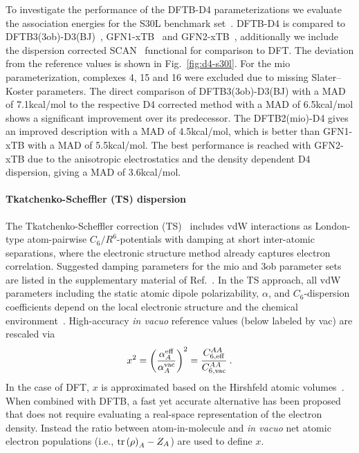 \documentclass[reprint,onecolumn,superscriptaddress]{revtex4-1}
\begin{document}
To investigate the performance of the DFTB-D4 parameterizations we evaluate the
association energies for the S30L benchmark set~\cite{sure2015,brandenburg2018}.
DFTB-D4 is compared to DFTB3(3ob)-D3(BJ)~\cite{brandenburg2014},
GFN1-xTB~\cite{grimme2017} and GFN2-xTB~\cite{bannwarth2019}, additionally we
include the dispersion corrected SCAN~\cite{sun2015} functional for comparison
to DFT.  The deviation from the reference values is shown in
Fig.~\ref{fig:d4-s30l}. For the mio parameterization, complexes 4, 15 and 16
were excluded due to missing Slater--Koster parameters.  The direct comparison
of DFTB3(3ob)-D3(BJ) with a MAD of 7.1\;kcal/mol to the respective D4 corrected
method with a MAD of 6.5\;kcal/mol shows a significant improvement over its
predecessor. The DFTB2(mio)-D4 gives an improved description with a MAD of
4.5\;kcal/mol, which is better than GFN1-xTB with a MAD of 5.5\;kcal/mol. The
best performance is reached with GFN2-xTB due to the anisotropic electrostatics
and the density dependent D4 dispersion, giving a MAD of 3.6\;kcal/mol.


\paragraph{Tkatchenko-Scheffler (TS) dispersion}

The Tkatchenko-Scheffler correction (TS)~\cite{Tkatchenko2009} includes vdW
interactions as London-type atom-pairwise $C_6/R^6$-potentials with damping at
short inter-atomic separations, where the electronic structure method already
captures electron correlation. Suggested damping parameters for the mio and 3ob
parameter sets are listed in the supplementary material of
Ref.~\cite{hourahine-JCP-152-124101}. In the TS approach, all vdW parameters
including the static atomic dipole polarizability, $\alpha$, and
$C_6$-dispersion coefficients depend on the local electronic structure and the
chemical environment~\cite{Tkatchenko2009}. High-accuracy \textit{in vacuo}
reference values (below labeled by vac) are rescaled via
\begin{equation}
  x^2 = \left(\frac{\alpha_A^{\rm eff}}{\alpha_A^{\rm vac}}\right)^2 =
  \frac{C_{6,{\rm eff}}^{AA}}{C_{6,{\rm vac}}^{AA}}\:.
  \label{eq:MBDTS_effective_alphaC6}
\end{equation}
In the case of DFT, $x$ is approximated based on the Hirshfeld atomic
volumes~\cite{Hirshfeld1977}. When combined with DFTB, a fast yet accurate
alternative has been proposed~\cite{Stoehr2016} that does not require
evaluating a real-space representation of the electron density. Instead the
ratio between atom-in-molecule and \textit{in vacuo} net atomic electron
populations (i.e., $\operatorname{tr}\left(\rho\right)_A - Z_A$) are used to define $x$.
\end{document}

